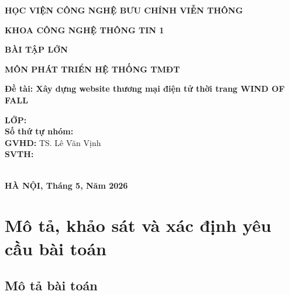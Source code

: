 \documentclass[12pt,a4paper]{report}
\begin{document}
\begin{titlepage}
    \centering
    {\bfseries\fontsize{16}{20}\selectfont HỌC VIỆN CÔNG NGHỆ BƯU CHÍNH VIỄN THÔNG\par}
    \vspace{0.4cm}
    {\bfseries\fontsize{15}{19}\selectfont KHOA CÔNG NGHỆ THÔNG TIN 1\par}
    \vspace{2.2cm}
    {\bfseries\fontsize{22}{26}\selectfont BÀI TẬP LỚN\par}
    \vspace{0.7cm}
    {\bfseries\fontsize{16}{20}\selectfont MÔN PHÁT TRIỂN HỆ THỐNG TMĐT\par}
    \vspace{1.5cm}
    {\bfseries\fontsize{18}{22}\selectfont Đề tài: Xây dựng website thương mại điện tử thời trang WIND OF FALL\par}
    \vspace{2cm}
    \begin{flushleft}
        \hspace{2.8cm}\textbf{LỚP:} \dotfill\\[0.35cm]
        \hspace{2.8cm}\textbf{Số thứ tự nhóm:} \dotfill\\[0.35cm]
        \hspace{2.8cm}\textbf{GVHD:} TS. Lê Văn Vịnh\\[0.35cm]
        \hspace{2.8cm}\textbf{SVTH:} \dotfill\\[0.35cm]
        \hspace{4.2cm}\dotfill\\[0.35cm]
        \hspace{4.2cm}\dotfill
    \end{flushleft}
    \vfill
    {\bfseries HÀ NỘI, Tháng 5, Năm 2026\par}
\end{titlepage}

\tableofcontents
\clearpage
{}

\chapter{Mô tả, khảo sát và xác định yêu cầu bài toán}

\section{Mô tả bài toán}
\end{document}

